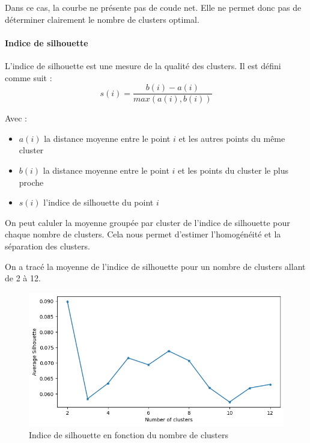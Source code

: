 \documentclass[french,a4paper,18pt]{article}
\begin{document}
Dans ce cas, la courbe ne présente pas de coude net. Elle ne permet donc pas de déterminer clairement le nombre de clusters optimal.

\paragraph{Indice de silhouette}

L'indice de silhouette est une mesure de la qualité des clusters.
Il est défini comme suit :
\begin{equation}
    s(i) = \frac{b(i) - a(i)}{max(a(i), b(i))}
    \label{eq:silhouette_i}
\end{equation}

Avec :
\begin{itemize}
    \item $a(i)$ la distance moyenne entre le point $i$ et les autres points du même cluster
    \item $b(i)$ la distance moyenne entre le point $i$ et les points du cluster le plus proche
    \item $s(i)$ l'indice de silhouette du point $i$
\end{itemize}

On peut caluler la moyenne groupée par cluster de l'indice de silhouette pour chaque nombre de clusters.
Cela nous permet d'estimer l'homogénéité et la séparation des clusters.

On a tracé la moyenne de l'indice de silhouette pour un nombre de clusters allant de 2 à 12.

\begin{figure}[h!]
    \centering
    \includegraphics[scale=0.4]{images/mnist_kmeans_silhouette.png}
    \caption{Indice de silhouette en fonction du nombre de clusters}\label{fig:mnist_kmeans_silhouette}
\end{figure}
\end{document}
